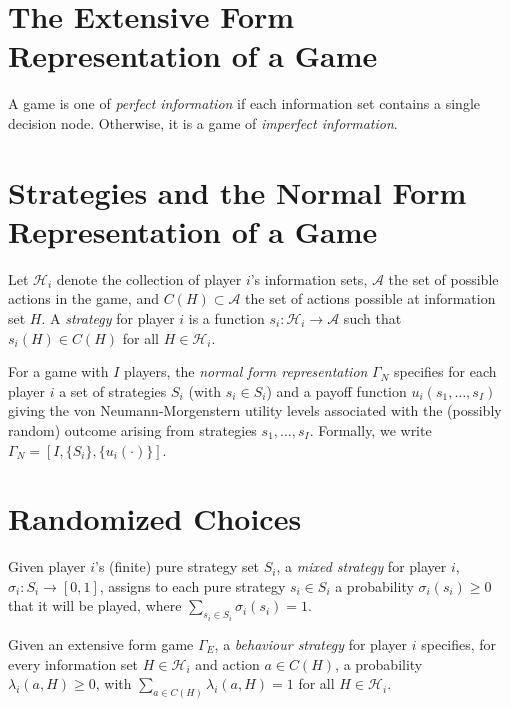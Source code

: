 \addtocounter{section}{1}

\addtocounter{section}{1}


\section{The Extensive Form Representation of a Game}

\begin{defn}
    A game is one of \emph{perfect information} if each information set contains a single decision node. Otherwise, it is a game of \emph{imperfect information}.
\end{defn}


\section{Strategies and the Normal Form Representation of a Game}

\begin{defn}
    Let $\mathscr{H}_i$ denote the collection of player $i$'s information sets, $\mathscr{A}$ the set of possible actions in the game, and $C(H) \subset \mathscr{A}$ the set of actions possible at information set $H$. A \emph{strategy} for player $i$ is a function $s_i : \mathscr{H}_i \to \mathscr{A}$ such that $s_i(H) \in C(H)$ for all $H \in \mathscr{H}_i$.
\end{defn}

\begin{defn}
    For a game with $I$ players, the \emph{normal form representation} $\Gamma_N$ specifies for each player $i$ a set of strategies $S_i$ (with $s_i \in S_i$) and a payoff function $u_i(s_1, \dots, s_I)$ giving the von Neumann-Morgenstern utility levels associated with the (possibly random) outcome arising from strategies $s_1, \dots, s_I$. Formally, we write $\Gamma_N = [I, \{S_i\}, \{u_i(\cdot)\}]$.
\end{defn}


\section{Randomized Choices}

\begin{defn}
    Given player $i$'s (finite) pure strategy set $S_i$, a \emph{mixed strategy} for player $i$, $\sigma_i : S_i \to [0, 1]$, assigns to each pure strategy $s_i \in S_i$ a probability $\sigma_i(s_i) \geq 0$ that it will be played, where $\sum_{s_i \in S_i} \sigma_i(s_i) = 1$.
\end{defn}

\begin{defn}
    Given an extensive form game $\Gamma_E$, a \emph{behaviour strategy} for player $i$ specifies, for every information set $H \in \mathscr{H}_i$ and action $a \in C(H)$, a probability $\lambda_i(a, H) \geq 0$, with $\sum_{a \in C(H)} \lambda_i(a, H) = 1$ for all $H \in \mathscr{H}_i$.
\end{defn}
